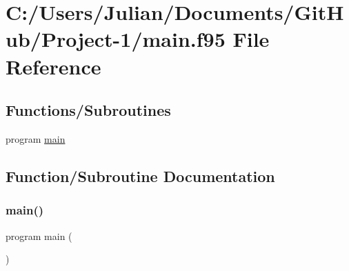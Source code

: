 \hypertarget{main_8f95}{}\section{C\+:/\+Users/\+Julian/\+Documents/\+Git\+Hub/\+Project-\/1/main.f95 File Reference}
\label{main_8f95}
\subsection*{Functions/\+Subroutines}
\begin{DoxyCompactItemize}
\item 
program \mbox{\hyperlink{main_8f95_a8ec2266d83cd6c0b762cbcbc92c0af3d}{main}}
\end{DoxyCompactItemize}


\subsection{Function/\+Subroutine Documentation}
\mbox{\label{main_8f95_a8ec2266d83cd6c0b762cbcbc92c0af3d}} 
\subsubsection{\texorpdfstring{main()}{main()}}
{\footnotesize\ttfamily program main (\begin{DoxyParamCaption}{ }\end{DoxyParamCaption})}

